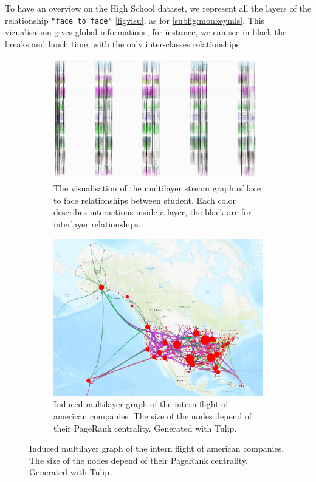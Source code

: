 \documentclass{svproc}
\begin{document}
To have an overview on the High School dataset, we represent all the layers of the relationship \texttt{"face to face"} \cref{figvisu}, as for \cref{subfig:monkeymls}. This vizualisation gives global informations, for instance, we can see in black the breaks and lunch time, with the only inter-classes relationships.
\begin{figure}
\begin{subfigure}{0.50\textwidth}
	\includegraphics[width=\textwidth]{img/lycee/lyceeentier.JPG}
	\caption{The visualisation of the multilayer stream graph of face to face relationships between student. Each color describes interactions inside a layer, the black are for interlayer relationships.}
	\label{fig:visuLycee}
	\end{subfigure}
	\begin{subfigure}{0.40\textwidth}
	\includegraphics[width=\textwidth]{img/planes/map.jpg}
	\caption{Induced multilayer graph of the intern flight of american companies. The size of the nodes depend of their PageRank centrality. Generated with Tulip. }
	\end{subfigure}
\end{figure}
\end{document}
